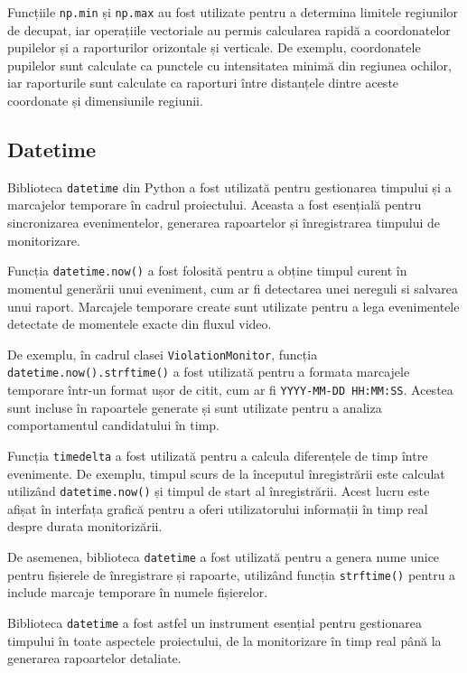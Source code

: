 \documentclass[12pt,a4paper]{article}
\begin{document}
Funcțiile \texttt{np.min} și \texttt{np.max} au fost utilizate pentru a determina limitele regiunilor de decupat, iar operațiile vectoriale au permis calcularea rapidă a coordonatelor pupilelor și a raporturilor orizontale și verticale. De exemplu, coordonatele pupilelor sunt calculate ca punctele cu intensitatea minimă din regiunea ochilor, iar raporturile sunt calculate ca raporturi între distanțele dintre aceste coordonate și dimensiunile regiunii.

\subsection{Datetime}
Biblioteca \texttt{datetime}\cite{pythondatetime} din Python a fost utilizată pentru gestionarea timpului și a marcajelor temporare în cadrul proiectului. Aceasta a fost esențială pentru sincronizarea evenimentelor, generarea rapoartelor și înregistrarea timpului de monitorizare.

Funcția \texttt{datetime.now()} a fost folosită pentru a obține timpul curent în momentul generării unui eveniment, cum ar fi detectarea unei nereguli si salvarea unui raport. Marcajele temporare create sunt utilizate pentru a lega evenimentele detectate de momentele exacte din fluxul video.

De exemplu, în cadrul clasei \texttt{ViolationMonitor}, funcția \texttt{datetime.now().strftime()} a fost utilizată pentru a formata marcajele temporare într-un format ușor de citit, cum ar fi \texttt{YYYY-MM-DD HH:MM:SS}. Acestea sunt incluse în rapoartele generate și sunt utilizate pentru a analiza comportamentul candidatului în timp.

Funcția \texttt{timedelta} a fost utilizată pentru a calcula diferențele de timp între evenimente. De exemplu, timpul scurs de la începutul înregistrării este calculat utilizând \texttt{datetime.now()} și timpul de start al înregistrării. Acest lucru este afișat în interfața grafică pentru a oferi utilizatorului informații în timp real despre durata monitorizării.

De asemenea, biblioteca \texttt{datetime} a fost utilizată pentru a genera nume unice pentru fișierele de înregistrare și rapoarte, utilizând funcția \texttt{strftime()} pentru a include marcaje temporare în numele fișierelor.

Biblioteca \texttt{datetime} a fost astfel un instrument esențial pentru gestionarea timpului în toate aspectele proiectului, de la monitorizare în timp real până la generarea rapoartelor detaliate.
\end{document}
